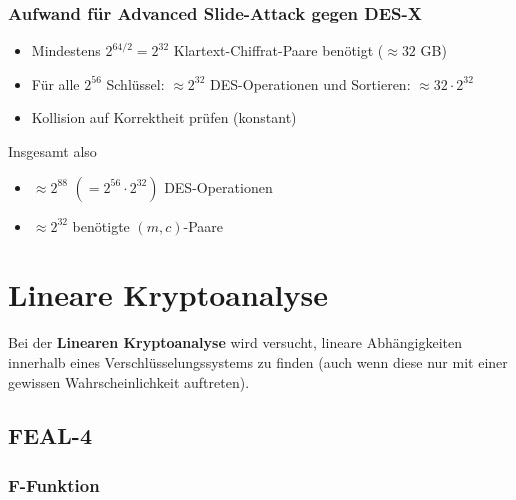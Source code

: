 \documentclass[12pt,A4]{extarticle}
\newcommand{\highlight}[1]{\textcolor{highlightColor}{\textbf{#1}}}
\begin{document}
\subsubsection{Aufwand für Advanced Slide-Attack gegen DES-X}
\begin{itemize}
  \item{Mindestens $2^{64 / 2} = 2^{32}$ Klartext-Chiffrat-Paare benötigt ($\approx 32$ GB)}
  \item{Für alle $2^{56}$ Schlüssel: $\approx 2^{32}$ DES-Operationen und Sortieren: $\approx 32 \cdot 2^{32}$}
  \item{Kollision auf Korrektheit prüfen (konstant)}
\end{itemize}
Insgesamt also
\begin{itemize}
  \item{$\approx 2^{88}$ $(= 2^{56} \cdot 2^{32})$ DES-Operationen}
  \item{$\approx 2^{32}$ benötigte $(m,c)$-Paare}
\end{itemize}

\section{Lineare Kryptoanalyse}
Bei der \highlight{Linearen Kryptoanalyse} wird versucht, lineare Abhängigkeiten innerhalb eines Verschlüsselungssystems zu finden (auch wenn diese nur mit einer gewissen Wahrscheinlichkeit auftreten).
\subsection{FEAL-4}
\subsubsection{F-Funktion}
\end{document}
